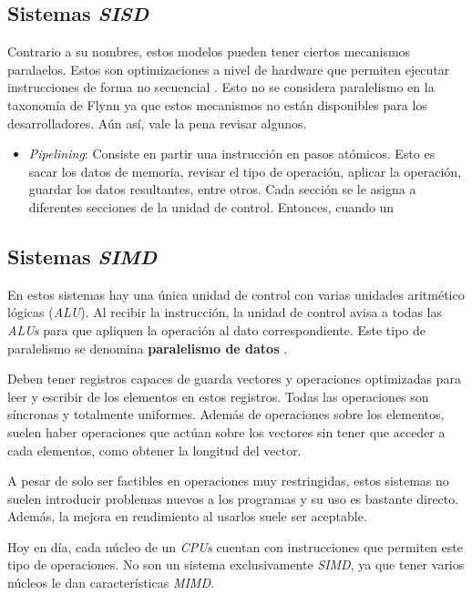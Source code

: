 \subsection{Sistemas \textit{SISD}}

Contrario a su nombres, estos modelos pueden tener ciertos mecanismos
paralaelos. Estos son optimizaciones a nivel de hardware que permiten ejecutar
instrucciones de forma no secuencial . Esto no se considera
paralelismo en la taxonomía de Flynn ya que estos mecanismos no están
disponibles para los desarrolladores. Aún así, vale la pena revisar algunos.

\begin{itemize}
  \item \emph{Pipelining}:
        Consiste en partir una instrucción en pasos atómicos. Esto es sacar los
        datos de memoria, revisar el tipo de operación, aplicar la operación,
        guardar los datos resultantes, entre otros. Cada sección se le asigna a
        diferentes secciones de la unidad de control. Entonces, cuando un
\end{itemize}


\subsection{Sistemas \textit{SIMD}}

En estos sistemas hay una única unidad de control con varias unidades aritmético
lógicas (\textit{ALU}). Al recibir la instrucción, la unidad de control avisa a
todas las \textit{ALUs} para que apliquen la operación al dato correspondiente.
Este tipo de paralelismo se denomina \textbf{paralelismo de datos}
.

Deben tener registros capaces de guarda vectores y operaciones optimizadas para
leer y escribir de los elementos en estos registros. Todas las operaciones son
síncronas y totalmente uniformes. Además de operaciones sobre los elementos,
suelen haber operaciones que actúan sobre los vectores sin tener que acceder a
cada elementos, como obtener la longitud del vector.

A pesar de solo ser factibles en operaciones muy restringidas, estos sistemas
no suelen introducir problemas nuevos a los programas y su uso es bastante
directo. Además, la mejora en rendimiento al usarlos suele ser aceptable.

Hoy en día, cada núcleo de un \textit{CPUs}  cuentan con
instrucciones que permiten este tipo de operaciones. No son un sistema
exclusivamente \textit{SIMD}, ya que tener varios núcleos le dan
características \textit{MIMD}.

